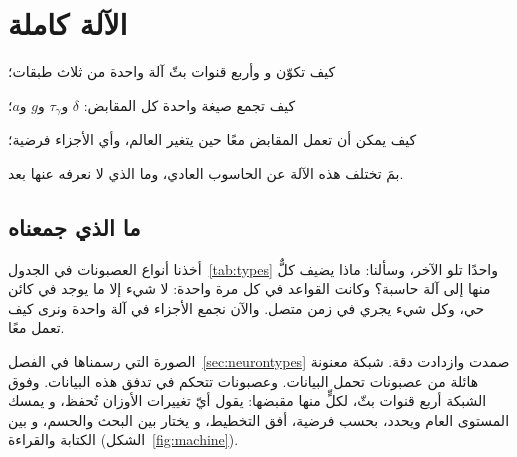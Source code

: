 \chapter{الآلة كاملة}
\label{sec:synthesis}
\begin{chaptergoals}
\item كيف تكوّن  و وأربع قنوات بثّ آلة واحدة من ثلاث طبقات؛
\item كيف تجمع صيغة واحدة كل المقابض: $\delta$ و$\tau_\gamma$ و$g$ و$a$؛
\item كيف يمكن أن تعمل المقابض معًا حين يتغير العالم، وأي الأجزاء فرضية؛
\item بمَ تختلف هذه الآلة عن الحاسوب العادي، وما الذي لا نعرفه عنها بعد.
\end{chaptergoals}

\section{ما الذي جمعناه}

أخذنا أنواع العصبونات في الجدول~\ref{tab:types} واحدًا تلو الآخر، وسألنا: ماذا يضيف كلٌّ منها إلى آلة حاسبة؟ وكانت القواعد في كل مرة واحدة: لا شيء إلا ما يوجد في كائن حي، وكل شيء يجري في زمن متصل. والآن نجمع الأجزاء في آلة واحدة ونرى كيف تعمل معًا.

الصورة التي رسمناها في الفصل~\ref{sec:neurontypes} صمدت وازدادت دقة. شبكة معنونة هائلة من عصبونات  تحمل البيانات. وعصبونات  تتحكم في تدفق هذه البيانات. وفوق الشبكة أربع قنوات بثّ، لكلٍّ منها مقبضها:  يقول أيّ تغييرات الأوزان تُحفظ، و يمسك المستوى العام ويحدد، بحسب فرضية، أفق التخطيط، و يختار بين البحث والحسم، و بين الكتابة والقراءة (الشكل~\ref{fig:machine}).

